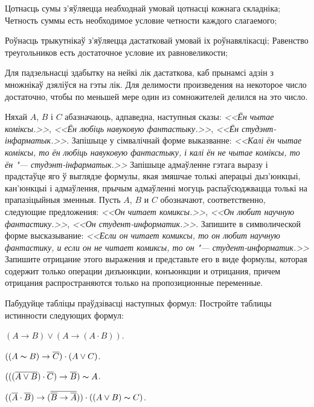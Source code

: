 \begin{problemList}
\begin{belarusianEnumerate}
\problemItemSimple
{Цотнасць сумы з'яўляецца неабходнай умовай цотнасці кожнага складніка;}
{Четность суммы есть необходимое условие четности каждого слагаемого;}

\problemItemSimple
{Роўнасць трыкутнікаў з'яўляецца дастатковай умовай іх роўнавялікасці;}
{Равенство треугольников есть достаточное условие их равновеликости;}

\problemItemSimple
{Для падзельнасці здабытку на нейкі лік дастаткова, каб прынамсі адзін з множнікаў дзяліўся на гэты лік.}
{Для делимости произведения на некоторое число достаточно, чтобы по меньшей мере один из сомножителей делился на это число.}

\end{belarusianEnumerate}

\newpage

\problemItemSimple
{Няхай $A$, $B$ і $C$ абазначаюць, адпаведна, наступныя сказы:
\textit{<<Ён чытае коміксы.>>},
\textit{<<Ён любіць навуковую фантастыку.>>},
\textit{<<Ён студэнт-інфарматык.>>}.
Запішыце у сімвалічнай форме выказванне: \textit{<<Калі ён чытае коміксы,
то ён любіць навуковую фантастыку, і калі ён не чытае коміксы, то ён "---
студэнт-інфарматык.>>} Запішыце адмаўленне гэтага выразу і прадстаўце яго ў выглядзе формулы,
якая змяшчае толькі аперацыі дыз'юнкцыі, кан'юнкцыі і адмаўлення, прычым адмаўленні могуць распаўсюджвацца
толькі на прапазіцыйныя зменныя.}
{Пусть $A$, $B$ и $C$ обозначают, соответственно, следующие предложения:
\textit{<<Он читает комиксы.>>},
\textit{<<Он любит научную фантастику.>>},
\textit{<<Он студент-информатик.>>}.
Запишите в символической форме высказывание: \textit{<<Если он читает
комиксы, то он любит научную фантастику, и если он не читает комиксы, то он "---
студент-информатик.>>} Запишите отрицание этого выражения и представьте
его в виде формулы, которая содержит только операции дизъюнкции, конъюнкции и
отрицания, причем отрицания распространяются только на пропозиционные переменные.}

\bigskip

\problemItemWithCommonPart
{Пабудуйце табліцы праўдзівасці наступных формул:}
{Постройте таблицы истинности следующих формул:}
{%
\begin{belarusianEnumerate}
    \item $(A \to B) \vee (A \to (A \cdot B))$.
    \item $((A \thicksim B) \to \overline{C}) \cdot (A \vee C)$.
    \item $(((\overline{A \vee B}) \cdot \overline{C}) \to \overline{B}) \thicksim A$.
    \item $((\overline{A} \cdot \overline{B}) \to (\overline{\overline{B} \to \overline{A}}))
    \cdot ((A \vee B) \thicksim C)$.
\end{belarusianEnumerate}
}


\end{problemList}
